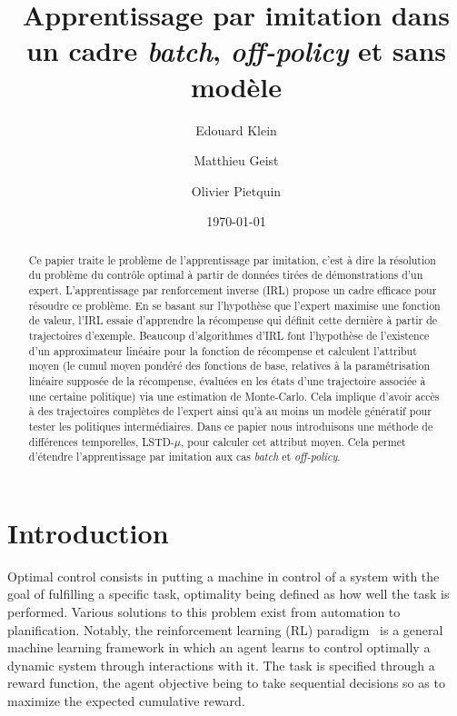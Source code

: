 \documentclass{llncs}
\title{Apprentissage par imitation dans un cadre \emph{batch}, \emph{off-policy} et sans modèle}
\author{Edouard Klein\inst{1}\inst{3} \and Matthieu Geist\inst{1} \and Olivier Pietquin\inst{1}\inst{2}}
\institute{
 1. Supélec-Metz Campus, IMS Research group, France, \texttt{prenom.nom@supelec.fr}\\
 2. UMI 2958 CNRS - GeorgiaTech, France\\
 3. Equipe ABC, LORIA-CNRS, France.
 }
\date{\today}
\begin{document}
\maketitle
\begin{abstract}
 Ce papier traite le problème de l'apprentissage par imitation, c'est à dire la résolution du problème du contrôle optimal à partir de données tirées de démonstrations d'un expert. L'apprentissage par renforcement inverse (IRL) propose un cadre efficace pour résoudre ce problème. En se basant sur l'hypothèse que l'expert maximise une fonction de valeur,  l'IRL essaie d'apprendre la récompense qui définit cette dernière à partir de trajectoires d'exemple. Beaucoup d'algorithmes d'IRL font l'hypothèse de l'existence d'un approximateur linéaire pour la fonction de récompense et calculent l'attribut moyen (le cumul moyen pondéré des fonctions de base, relatives à la paramétrisation linéaire supposée de la récompense, évaluées en les états d'une trajectoire associée à une certaine politique)  via une estimation de Monte-Carlo. Cela implique d'avoir accès à des trajectoires complètes de l'expert ainsi qu'à au moins un modèle génératif pour tester les politiques intermédiaires. Dans ce papier nous introduisons une méthode de différences temporelles, LSTD-$\mu$, pour calculer cet attribut moyen. Cela permet d'étendre l'apprentissage par imitation aux cas \emph{batch} et \emph{off-policy}.
\end{abstract}
\section{Introduction}

Optimal control consists in putting a machine in control of a system
with the goal of fulfilling a specific task, optimality being
defined as how well the task is performed. Various solutions to this
problem exist from automation to planification. Notably, the
reinforcement learning (RL) paradigm~\citep{sutton1998reinforcement} is a general
machine learning framework in which an agent learns to control
optimally a dynamic system through interactions with it. The task is
specified through a reward function, the agent objective being to
take sequential decisions so as to maximize the expected cumulative
reward.
\end{document}

